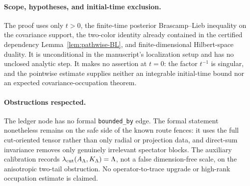 \documentclass[../main.tex]{subfiles}
\begin{document}
\paragraph{Scope, hypotheses, and initial-time exclusion.}
The proof uses only $t>0$, the finite-time posterior Brascamp--Lieb inequality on the covariance
support, the two-color identity already contained in the certified dependency
Lemma~\ref{lem:pathwise-BL}, and finite-dimensional Hilbert-space duality.  It is unconditional
in the manuscript's localization setup and has no unclosed analytic step.  It makes no assertion
at $t=0$: the factor $t^{-1}$ is singular, and the pointwise estimate supplies neither an
integrable initial-time bound nor an expected covariance-occupation theorem.

\paragraph{Obstructions respected.}
The ledger node has no formal \texttt{bounded\_by} edge.  The formal statement nonetheless
remains on the safe side of the known route fences: it uses the full cut-oriented tensor rather
than only radial or projection data, and direct-sum invariance removes only genuinely irrelevant
spectator blocks.  The auxiliary calibration records
$\lambda_{\rm cut}(A_\Lambda,K_\Lambda)=\Lambda$, not a false dimension-free scale, on the
anisotropic two-tail obstruction.  No operator-to-trace upgrade or high-rank occupation estimate
is claimed.
\end{document}
